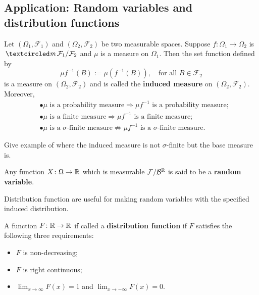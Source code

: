%
%
\subsection{Application: Random variables and distribution functions }



\begin{theorem}
Let $(\Omega_1, \mathcal F_1)$ and $(\Omega_2,\mathcal F_2)$ be two measurable spaces. Suppose $f:\Omega_1\rightarrow \Omega_2$ is $\mcirc \mathcal F_1/\mathcal F_2$ and $\mu$ is a measure on $\Omega_1$. Then the set function defined by
\[ \mu f^{-1}(B):=\mu(f^{-1}(B)),\quad\text{for all $B\in\mathcal F_2$}\]
 is a measure on $(\Omega_2,\mathcal F_2)$ and is called the {\bf induced measure} on $(\Omega_2,\mathcal F_2)$. Moreover,
 \begin{align*}
 &\bullet\text{$\mu$ is a probability measure} \Longrightarrow  \text{$\mu f^{-1}$ is a probability measure;}\\
 &\bullet\text{$\mu$ is a finite measure} \Longrightarrow  \text{$\mu f^{-1}$ is a finite measure;} \\
 &\bullet\text{$\mu$ is a $\sigma$-finite measure} \not\Longrightarrow  \text{$\mu f^{-1}$ is a $\sigma$-finite measure.}
 \end{align*}
\end{theorem}


Give example of where the induced measure is not $\sigma$-finite but the base measure is.



\begin{definition}
Any function $X\colon \Omega \rightarrow \Bbb R$ which is measurable $\mathcal F/\mathcal B^{\Bbb R}$  is said to be a {\bf random variable}.
\end{definition}

Distribution function are useful for making random variables with the specified induced distribution.

\begin{definition}
A function $F\colon\Bbb R\rightarrow\Bbb R$ if called a {\bf distribution function} if $F$ satisfies the following three requirements:
\begin{itemize}
\item $F$ is non-decreasing;
\item $F$ is right continuous;
\item $\lim_{x\rightarrow \infty} F(x)=1$ and $\lim_{x\rightarrow -\infty} F(x)=0$.
\end{itemize}
\end{definition}


